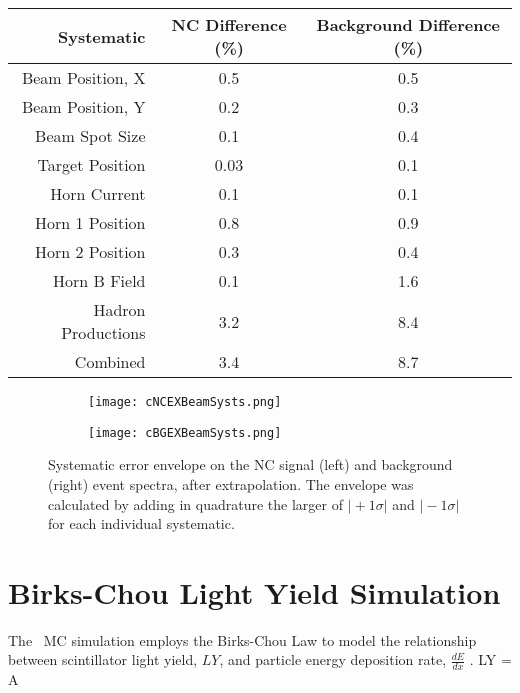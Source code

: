 \begin{doublespace}
\begin{table}[h]
\begin{center}
    \label{tab:SystBeam}
    \begin{tabular}{r c c}
      \hline\hline
      Systematic & NC Difference (\%) & Background Difference (\%) \\
      \hline
      Beam Position, X & 0.5 & 0.5 \\
      Beam Position, Y & 0.2 & 0.3 \\
      Beam Spot Size & 0.1 & 0.4 \\
      Target Position & 0.03 & 0.1 \\
      Horn Current & 0.1 & 0.1 \\
      Horn 1 Position & 0.8 & 0.9 \\
      Horn 2 Position & 0.3 & 0.4 \\
      Horn B Field & 0.1 & 1.6 \\
      Hadron Productions & 3.2 & 8.4 \\
      \hline
      Combined & 3.4 & 8.7 \\
      \hline
    \end{tabular}
  \end{center}
\end{table}

\begin{figure}[h]
  \centering
  \begin{subfigure}{.48\textwidth}
    \centering
    \texttt{[image: cNCEXBeamSysts.png]}
  \end{subfigure}
  \begin{subfigure}{.48\textwidth}
    \centering
    \texttt{[image: cBGEXBeamSysts.png]}
  \end{subfigure}
  \caption[Beam Systematic Error Envelopes]{Systematic error envelope on the NC signal (left) and background (right) event spectra, after extrapolation. The envelope was calculated by adding in quadrature the larger of $\vert +1\sigma \vert$ and $\vert -1\sigma \vert$ for each individual systematic.}
  \label{fig:SystBeam}
\end{figure}

\section{Birks-Chou Light Yield Simulation}

The \nova~MC simulation employs the Birks-Chou Law to model the relationship between scintillator light yield, $LY$, and particle energy deposition rate, $\frac{dE}{dx}$ \cite{ref:BirksChou}. 
\beq
LY = A  
\label{eq:BirksChou}
\eeq


\end{doublespace}
